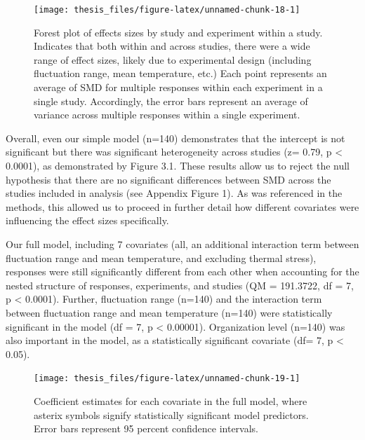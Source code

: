 \documentclass[12pt,twoside]{reedthesis}
\begin{document}
\begin{figure}

{\centering \texttt{[image: thesis\_files/figure-latex/unnamed-chunk-18-1]} 

}

\caption[Forest plot of effect sizes]{Forest plot of effects sizes by study and experiment within a study. Indicates that both within and across studies, there were a wide range of effect sizes, likely due to experimental design (including fluctuation range, mean temperature, etc.) Each point represents an average of SMD for multiple responses within each experiment in a single study. Accordingly, the error bars represent an average of variance across multiple responses within a single experiment.}\label{fig:unnamed-chunk-18}
\end{figure}
Overall, even our simple model (n=140) demonstrates that the intercept is not significant but there was significant heterogeneity across studies (z= 0.79, p \textless{} 0.0001), as demonstrated by Figure 3.1. These results allow us to reject the null hypothesis that there are no significant differences between SMD across the studies included in analysis (see Appendix Figure 1). As was referenced in the methods, this allowed us to proceed in further detail how different covariates were influencing the effect sizes specifically.

Our full model, including 7 covariates (all, an additional interaction term between fluctuation range and mean temperature, and excluding thermal stress), responses were still significantly different from each other when accounting for the nested structure of responses, experiments, and studies (QM = 191.3722, df = 7, p \textless{} 0.0001). Further, fluctuation range (n=140) and the interaction term between fluctuation range and mean temperature (n=140) were statistically significant in the model (df = 7, p \textless{} 0.00001). Organization level (n=140) was also important in the model, as a statistically significant covariate (df= 7, p \textless{} 0.05).
\begin{figure}

{\centering \texttt{[image: thesis\_files/figure-latex/unnamed-chunk-19-1]} 

}

\caption[Coefficient estimates for full model]{Coefficient estimates for each covariate in the full model, where asterix symbols signify statistically significant model predictors.  Error bars represent 95 percent confidence intervals.}\label{fig:unnamed-chunk-19}
\end{figure}
\clearpage
\end{document}

